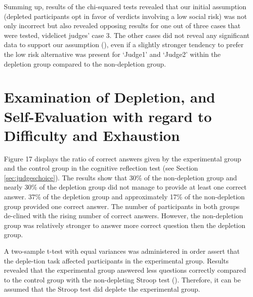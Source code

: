Summing up, results of the chi-squared tests revealed that our initial assumption (depleted participants opt in favor of verdicts involving a low social risk) was not only incorrect but also revealed opposing results for one out of three cases that were tested, videlicet judges’ case 3. The other cases did not reveal any significant data to support our assumption (), even if a slightly stronger tendency to prefer the low risk alternative was present for ‘Judge1’ and ‘Judge2’ within the depletion group compared to the non-depletion group.\par

\FloatBarrier
\section{Examination of Depletion, and Self-Evaluation with regard to Difficulty and Exhaustion}\label{sec:depletion_measure_selfevaluation}
Figure 17 displays the ratio of correct answers given by the experimental group and the control group in the cognitive reflection test (see Section \ref{sec:judgeschoice}). The results show that 30\% of the non-depletion group and nearly 30\% of the depletion group did not manage to provide at least one correct answer. 37\% of the depletion group and approximately 17\% of the non-depletion group provided one correct answer. The number of participants in both groups de-clined with the rising number of correct answers. However, the non-depletion group was relatively stronger to answer more correct question then the depletion group. \par
A two-sample t-test with equal variances was administered in order assert that the deple-tion task affected participants in the experimental group. Results revealed that the experimental group answered less questions correctly compared to the control group with the non-depleting Stroop test (). Therefore, it can be assumed that the Stroop test did deplete the experimental group. \par
